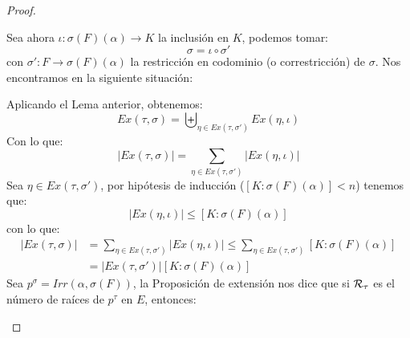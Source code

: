 \begin{prop}
\begin{proof}
\begin{itemize}
                Sea ahora $\iota:\sigma(F)(\alpha)\to K$ la inclusión en $K$, podemos tomar:
                \begin{equation*}
                    \sigma = \iota \circ \sigma'
                \end{equation*}
                con $\sigma':F\to \sigma(F)(\alpha)$ la restricción en codominio (o correstricción) de $\sigma$. Nos encontramos en la siguiente situación:
                \begin{figure}[H]
                    \centering
                \end{figure}
                \noindent
                Aplicando el Lema anterior, obtenemos:
                \begin{equation*}
                    Ex(\tau,\sigma) = \biguplus_{\eta \in Ex(\tau,\sigma')}Ex(\eta, \iota)
                \end{equation*}
                Con lo que:
                \begin{equation*}
                    |Ex(\tau,\sigma)| = \sum_{\eta \in  Ex(\tau, \sigma')}|Ex(\eta,\iota)|
                \end{equation*}
                Sea $\eta\in Ex(\tau,\sigma')$, por hipótesis de inducción ($[K:\sigma(F)(\alpha)]<n$) tenemos que:
                \begin{equation*}
                    |Ex(\eta,\iota)| \leq [K:\sigma(F)(\alpha)]
                \end{equation*}
                con lo que:
                \begin{align*}
                    |Ex(\tau,\sigma)| &= \sum_{\eta\in Ex(\tau,\sigma')}|Ex(\eta,\iota)| \leq \sum_{\eta\in Ex(\tau,\sigma')}[K:\sigma(F)(\alpha)] \\
                                      &= |Ex(\tau,\sigma')|[K:\sigma(F)(\alpha)]
                \end{align*}
                Sea $p^\sigma = Irr(\alpha,\sigma(F))$, la Proposición de extensión nos dice que si $\mathcal{R}_\tau$ es el número de raíces de $p^\tau$ en $E$, entonces:
                \begin{equation*}

\end{equation*}
\end{itemize}
\end{proof}
\end{prop}
